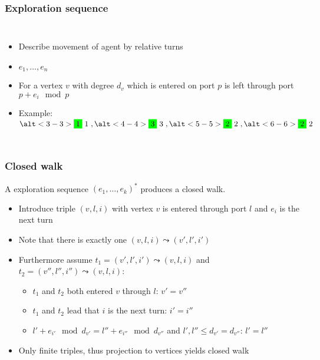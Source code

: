 \documentclass{beamer}
\begin{document}
\begin{frame}
  \frametitle{Exploration sequence}
  \begin{columns}
    \begin{itemize}
      \item Describe movement of agent by relative turns
      \item $e_{1},\dots, e_{n}$
      \item For a vertex $v$ with degree $d_{v}$ which is entered on port $p$
        is left through port $p + e_{i}\mod p$
      \item<2->[$\rightarrow$] Example:
        $\alt<3-3>{\colorbox{green}{1}}{\colorbox{white!0}{1}},
        \alt<4-4>{\colorbox{green}{3}}{\colorbox{white!0}{3}},
        \alt<5-5>{\colorbox{green}{2}}{\colorbox{white!0}{2}},
        \alt<6-6>{\colorbox{green}{2}}{\colorbox{white!0}{2}}$
    \end{itemize}
    \begin{center}
    \end{center}
  \end{columns}
\end{frame}

\begin{frame}
  \frametitle{Closed walk}
  \begin{theorem}
    A exploration sequence $(e_{1},\dots,e_{k})^{\ast}$ produces a closed walk.
  \end{theorem}
  \begin{itemize}
    \item Introduce triple $(v,l,i)$ with vertex $v$ is entered
      through port $l$ and $e_{i}$ is the next turn
    \item Note that there is exactly one $(v,l,i) \leadsto (v',l',i')$
    \item Furthermore assume $t_{1} = (v',l',i') \leadsto (v,l,i)$ and
      $t_{2} = (v'',l'',i'') \leadsto (v,l,i)$:
      \begin{itemize}
        \item $t_{1}$ and $t_{2}$ both entered $v$ through $l$: $v' = v''$
        \item $t_{1}$ and $t_{2}$ lead that $i$ is the next turn: $i' = i''$
        \item $l' + e_{i'} \mod d_{v'} = l'' + e_{i''} \mod d_{v''}$ and
          $l',l''\leq d_{v'} = d_{v''}$: $l' = l''$
      \end{itemize}
    \item Only finite triples, thus projection to vertices yields closed walk
  \end{itemize}
\end{frame}
\end{document}
